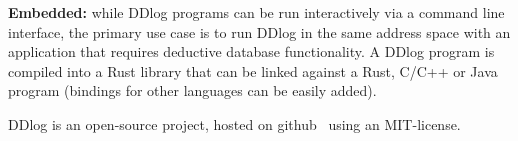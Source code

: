 \textbf{Embedded:} while DDlog programs can be run interactively via a
command line interface, the primary use case is to run DDlog in the
same address space with an application that requires deductive
database functionality.  A DDlog program is compiled into a Rust
library that can be linked against a Rust, C/C++ or Java program
(bindings for other languages can be easily added).

DDlog is an open-source project, hosted on github~\cite{ddlog} using
an MIT-license.
